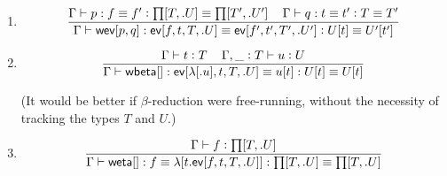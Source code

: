 \documentclass[11pt]{article}
\newcommand{\eqd}{\equiv}
\newcommand\spc{{\,\,\,\,\,\,\,}}
\newcommand{\ccolon}{\vcentcolon}
\newcommand{\ccheck}{\vcentcolon}            %
\newcommand{\Type}{\mathop{\text{ \sc type}}}
\newcommand{\Okay}{\mathop{\text{ \sc okay}}}
\newcommand{\Context}{\vdash\Okay}
\renewcommand{\Context}{\vdash}
\newcommand{\ha}[2]{#1[#2]}
\newcommand{\weta}{{\sf weta}}
\newcommand{\annot}{{\sf annot}}
\newcommand{\haa}[2]{\ha\annot{#1,#2}}
\renewcommand{\haa}[2]{#1}
\newcommand{\ev}{{\sf ev}}
\newcommand{\wbeta}{{\sf wbeta}}
\newcommand{\weveq}{{\sf wev}}
\newcommand{\var}{\char`_}
\newcommand{\defn}{\vcentcolon\equiv}
\begin{document}
\begin{enumerate}

Question: what makes the sentence $$\Gamma \vdash U[\haa t T] \Type $$
checkable, in the context above?

\item 
\[\frac{
   \Gamma \vdash p : f \eqd f' \ccolon {\ha\prod{T,.U}} \eqd {\ha\prod{T',.U'}} 
   \spc 
   \Gamma \vdash q : t \eqd t' \ccolon T \eqd T'
   }{
   \Gamma \vdash \ha\weveq{p,q} : \ha\ev{f,t,T,.U} \eqd \ha\ev{f',t',T',.U'} \ccolon U[\haa t T] \eqd U'[\haa {t'} {T'}]
  }\]

\item 
\[\frac{
  \Gamma \vdash t \ccheck{T} 
  \spc
  \Gamma, \var \ccolon T \vdash u \ccheck{U} 
  }{
  \Gamma \vdash \ha\wbeta{} : \ha\ev{\ha\lambda{.u},t,T,.U} \eqd u[\haa{t}{T}] : U[\haa{t}{T}] \eqd U[\haa{t}{T}]
}\]


(It would be better if $\beta$-reduction were free-running, without the
necessity of tracking the types $T$ and $U$.)

\item 
\[
  \frac{\Gamma \vdash f \ccheck{\ha\prod{T,.U}}}
       {\Gamma \vdash \ha\weta{} : f \eqd \ha\lambda{t.\ha\ev{f,t,T,.U}} : \ha\prod{T,.U} \eqd \ha\prod{T,.U}
       }
\]

\end{enumerate}



\end{document}
